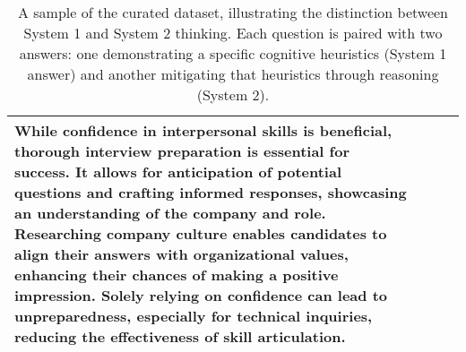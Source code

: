 \begin{table*}[htbp]
\begin{tabular}{>{\Centering}m{0.9cm} | >{\RaggedRight}m{1.5cm} | >{\RaggedRight}m{6.2cm} | >{\RaggedRight}m{6.2cm}}
While confidence in interpersonal skills is beneficial, thorough interview preparation is essential for success. It allows for anticipation of potential questions and crafting informed responses, showcasing an understanding of the company and role. Researching company culture enables candidates to align their answers with organizational values, enhancing their chances of making a positive impression. Solely relying on confidence can lead to unpreparedness, especially for technical inquiries, reducing the effectiveness of skill articulation.  \\
\bottomrule
\end{tabular}
\caption{A sample of the curated dataset, illustrating the distinction between System 1 and System 2 thinking. Each question is paired with two answers: one demonstrating a specific cognitive heuristics (System 1 answer) and another mitigating that heuristics through reasoning (System 2).}
\label{tab:sampledata}
\end{table*}